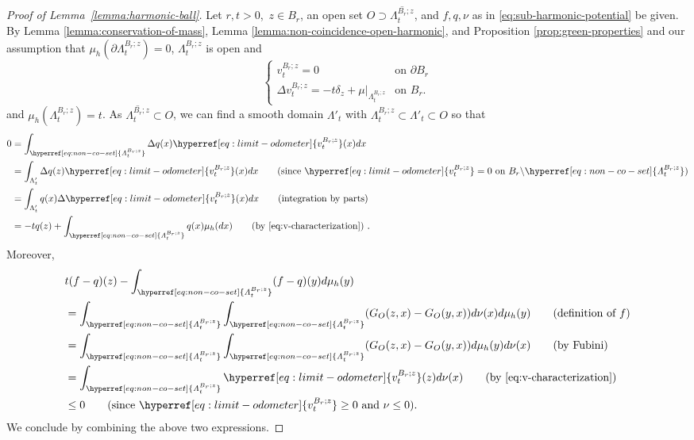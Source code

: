 \documentclass[12pt]{amsart}
\numberwithin{equation}{section}
\newcommand{\cluster}[2]{\hyperref[eq:non-co-set]{\mathit{\Lambda}^{#1}_{#2}}}
\newcommand{\odometer}[2]{\hyperref[eq:limit-odometer]{v^{#1}_{#2}}}
\begin{document}
	\begin{proof}[Proof of Lemma~\ref{lemma:harmonic-ball}]
		Let $r,t > 0$,~$z \in B_r$, an open set $O \supset \overline{{{\cluster{B_r; z}{t}}}}$, and $f, q, \nu$ as in \eqref{eq:sub-harmonic-potential} be given. By Lemma \ref{lemma:conservation-of-mass}, Lemma \ref{lemma:non-coincidence-open-harmonic}, and Proposition \ref{prop:green-properties} and our assumption that $\mu_h(\partial {\cluster{B_r;z}{t}}) = 0$, ${\cluster{B_r;z}{t}}$ is open and 
		\begin{equation} \label{eq:v-characterization}
		\begin{cases}
		\odometer{B_r;z}{t} = 0  &\mbox{on $\partial B_r$} \\
		\Delta \odometer{B_r;z}{t} = -t \delta_z + \mu|_{{{\cluster{B_r;z}{t}}}} &\mbox{on $B_r$}.
		\end{cases}
		\end{equation}
		and $\mu_h({\cluster{B_r;z}{t}}) = t$. As $\overline{{{\cluster{B_r;z}{t}}}} \subset O$, we can find a smooth domain $\Lambda'_t$ with ${\cluster{B_r;z}{t}} \subset \Lambda'_t \subset O$
		so that
		\begin{align*}
		0 &= \int_{{{\cluster{B_r;z}{t}}}} \Delta q(x) \odometer{B_r;z}{t}(x) dx \\
		&= \int_{\Lambda_t'} \Delta q(z) \odometer{B_r;z}{t}(x) dx  \qquad \mbox{(since $\odometer{B_r;z}{t} = 0$ on $B_r \backslash {\cluster{B_r;z }{t}}$)} \\
		&= \int_{\Lambda_t'} q(x) \Delta \odometer{B_r;z}{t}(x)dx  \qquad \mbox{(integration by parts)} \\ 
		&= -t q(z) + \int_{{{\cluster{B_r;z}{t}}}} q(x) \mu_h(dx) \qquad \mbox{(by \eqref{eq:v-characterization}) } .
		\end{align*}
		Moreover, 
		\begin{align*}
		&t (f-q)(z) - \int_{{{\cluster{B_r;z}{t}}}}(f-q)(y) d \mu_h(y)  \\
		&=\int_{{{\cluster{B_r;z}{t}}}} \int_{{{\cluster{B_r;z}{t}}}} (G_{O}(z,x) - G_{O}(y,x)) d \nu(x) d \mu_h(y)  \qquad \mbox{(definition of $f$)} \\
		&= \int_{{{\cluster{B_r;z}{t}}}} \int_{{{\cluster{B_r;z}{t}}}} (G_{O}(z,x) - G_{O}(y,x)) d \mu_h(y) d \nu(x) \qquad \mbox{(by Fubini)} \\
		&= \int_{{{\cluster{B_r;z}{t}}}} \odometer{B_r;z}{t}(z) d \nu(x)  \qquad \mbox{(by \eqref{eq:v-characterization}) } \\
		&\leq 0 \qquad \mbox{(since $\odometer{B_r;z}{t} \geq 0$ and $\nu \leq 0$)}.
		\end{align*}		
		We conclude by combining the above two expressions.
	\end{proof}	
	
\end{document}
